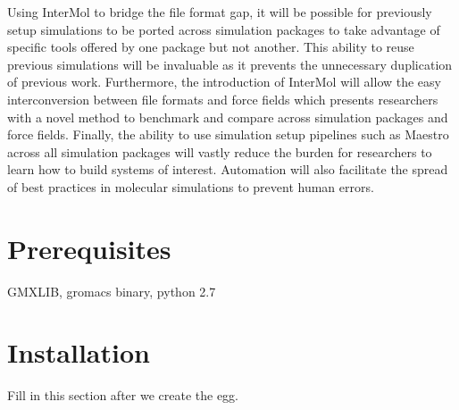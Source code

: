 \documentclass[12pt]{book}
\begin{document}
\par Using InterMol to bridge the file format gap, it will be possible for previously setup simulations to be ported across simulation packages to take advantage of specific tools offered by one package but not another. This ability to reuse previous simulations will be invaluable as it prevents the unnecessary duplication of previous work. Furthermore, the introduction of InterMol will allow the easy interconversion between file formats and force fields which presents researchers with a novel method to benchmark and compare across simulation packages and force fields. Finally, the ability to use simulation setup pipelines such as Maestro across all simulation packages will vastly reduce the burden for researchers to learn how to build systems of interest. Automation will also facilitate the spread of best practices in molecular simulations to prevent human errors.


\section{Prerequisites}

\par GMXLIB, gromacs binary, python 2.7

\section{Installation}

\par Fill in this section after we create the egg.

\printbibliography
\end{document}
